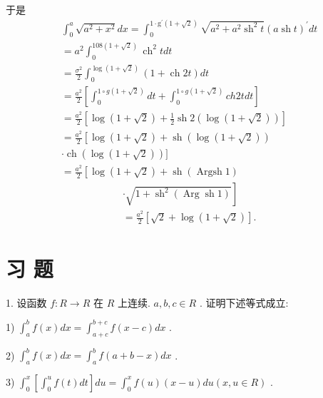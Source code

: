 于是
\begin{align*}
	&{\int }_{0}^{a}\sqrt{{a}^{2} + {x}^{2}}{dx} = {\int }_{0}^{1 \cdot  {\mathrm{g}}^{\prime }\left( {1 + \sqrt{2}}\right) }\sqrt{{a}^{2} + {a}^{2}{\operatorname{sh}}^{2}t}{\left( a\operatorname{sh}t\right) }^{\prime }{dt}\\
	&= {a}^{2}{\int }_{0}^{{108}\left( {1 + \sqrt{2}}\right) }{\operatorname{ch}}^{2}{tdt}\\
	&= \frac{{\sigma }^{2}}{2}{\int }_{0}^{\log \left( {1 + \sqrt{2}}\right) }\left( {1 + \operatorname{ch}{2t}}\right) {dt}\\
	&= \frac{{a}^{2}}{2}\left\lbrack  {{\int }_{0}^{1 \circ  g\left( {1 + \sqrt{2}}\right) }{dt} + {\int }_{0}^{1 \circ  g\left( {1 + \sqrt{2}}\right) }{ch2tdt}}\right\rbrack\\
	&= \frac{{a}^{2}}{2}\left\lbrack  {\log \left( {1 + \sqrt{2}}\right)  + \frac{1}{2}\operatorname{sh}2\left( {\log \left( {1 + \sqrt{2}}\right) }\right) }\right\rbrack\\
	&= \frac{{a}^{2}}{2}\left\lbrack  {\log \left( {1 + \sqrt{2}}\right)  + \operatorname{sh}\left( {\log \left( {1 + \sqrt{2}}\right) }\right) }\right.\\
	&\cdot  \operatorname{ch}\left( {\log \left( {1 + \sqrt{2}}\right) }\right) \rbrack\\
	&= \frac{{a}^{2}}{2}\left\lbrack  {\log \left( {1 + \sqrt{2}}\right)  + \operatorname{sh}\left( {\operatorname{Argsh}1}\right) }\right.
\end{align*}
\begin{align*}
	&\left. {\cdot \sqrt{1 + {\operatorname{sh}}^{2}\left( {\operatorname{Arg}\operatorname{sh}1}\right) }}\right\rbrack\\
	&= \frac{{a}^{2}}{2}\left\lbrack  {\sqrt{2} + \log \left( {1 + \sqrt{2}}\right) }\right\rbrack  .
\end{align*}

\section*{习 题}

1. 设函数 $f : R \rightarrow  R$ 在 $R$ 上连续. $a,b,c \in  R$ . 证明下述等式成立:

1) ${\int }_{a}^{b}f\left( x\right) {dx} = {\int }_{a + c}^{b + c}f\left( {x - c}\right) {dx}$ .

2) ${\int }_{a}^{b}f\left( x\right) {dx} = {\int }_{a}^{b}f\left( {a + b - x}\right) {dx}$ .

3) ${\int }_{0}^{x}\left\lbrack  {{\int }_{0}^{u}f\left( t\right) {dt}}\right\rbrack  {du} = {\int }_{0}^{x}f\left( u\right) \left( {x - u}\right) {du}\left( {x,u \in  R}\right)$ .

